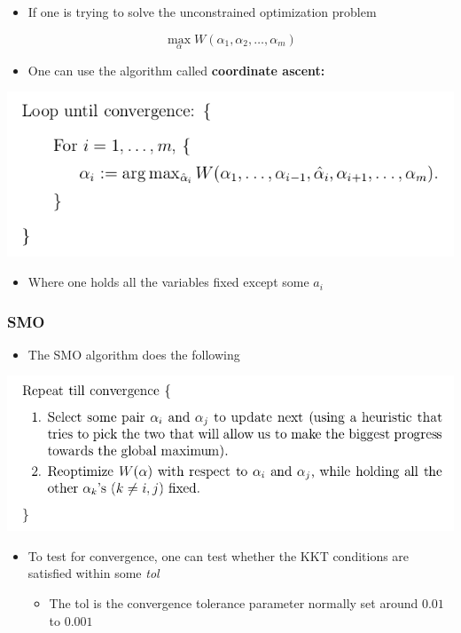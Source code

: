 \documentclass[11pt]{article}
\begin{document}
\begin{itemize}
\item If one is trying to solve the unconstrained optimization problem
\end{itemize}
\begin{equation}
  \max_\alpha W(\alpha_1,\alpha_2, \dots,\alpha_m)
\end{equation}
\begin{itemize}
\item One can use the algorithm called \textbf{coordinate ascent:}
\end{itemize}
\begin{center}
\includegraphics[width=.9\linewidth]{Support Vector Machines/screenshot_2018-09-25_08-47-20.png}
\end{center}
\begin{itemize}
\item Where one holds all the variables fixed except some \(a_i\)
\end{itemize}

\subsubsection{SMO}
\label{sec:orgee0b8f5}
\begin{itemize}
\item The SMO algorithm does the following
\end{itemize}
\begin{center}
\includegraphics[width=.9\linewidth]{Support Vector Machines/screenshot_2018-09-25_09-00-29.png}
\end{center}
\begin{itemize}
\item To test for convergence, one can test whether the KKT conditions are satisfied within some \emph{tol}
\begin{itemize}
\item The tol is the convergence tolerance parameter normally set around \(0.01\) to \(0.001\)
\end{itemize}
\end{itemize}
\end{document}
